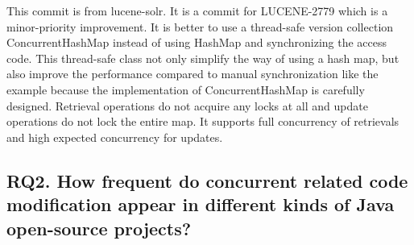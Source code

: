 This commit is from lucene-solr. It is a commit for LUCENE-2779 which is a minor-priority improvement. It is better to use a thread-safe version collection ConcurrentHashMap instead of using HashMap and synchronizing the access code. This thread-safe class not only simplify the way of using a hash map, but also improve the performance compared to manual synchronization like the example because the implementation of ConcurrentHashMap is carefully designed. Retrieval operations do not acquire any locks at all and update operations do not lock the entire map. It supports full concurrency of retrievals and high expected concurrency for updates.

%
%
%
%
%
%

\subsection{RQ2. How frequent do concurrent related code modification appear in different kinds of Java open-source projects?}

